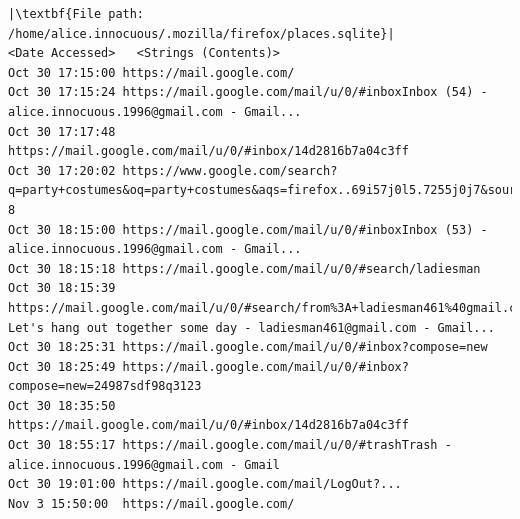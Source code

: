 \documentclass[addpoints]{exam}
\begin{document}
\begin{questions}
\begin{lstlisting}
|\textbf{File path: /home/alice.innocuous/.mozilla/firefox/places.sqlite}|
<Date Accessed>   <Strings (Contents)>   
Oct 30 17:15:00 https://mail.google.com/
Oct 30 17:15:24 https://mail.google.com/mail/u/0/#inboxInbox (54) - alice.innocuous.1996@gmail.com - Gmail...
Oct 30 17:17:48 https://mail.google.com/mail/u/0/#inbox/14d2816b7a04c3ff
Oct 30 17:20:02 https://www.google.com/search?q=party+costumes&oq=party+costumes&aqs=firefox..69i57j0l5.7255j0j7&sourceid=firefox&ex_sm=119&ie=UTF-8
Oct 30 18:15:00 https://mail.google.com/mail/u/0/#inboxInbox (53) - alice.innocuous.1996@gmail.com - Gmail...
Oct 30 18:15:18 https://mail.google.com/mail/u/0/#search/ladiesman
Oct 30 18:15:39 https://mail.google.com/mail/u/0/#search/from%3A+ladiesman461%40gmail.com/14d2816b7a04c3ffHey! Let's hang out together some day - ladiesman461@gmail.com - Gmail...
Oct 30 18:25:31 https://mail.google.com/mail/u/0/#inbox?compose=new
Oct 30 18:25:49 https://mail.google.com/mail/u/0/#inbox?compose=new=24987sdf98q3123
Oct 30 18:35:50 https://mail.google.com/mail/u/0/#inbox/14d2816b7a04c3ff
Oct 30 18:55:17 https://mail.google.com/mail/u/0/#trashTrash - alice.innocuous.1996@gmail.com - Gmail
Oct 30 19:01:00 https://mail.google.com/mail/LogOut?...
Nov 3 15:50:00  https://mail.google.com/

\end{lstlisting}

\end{questions}
\end{document}
